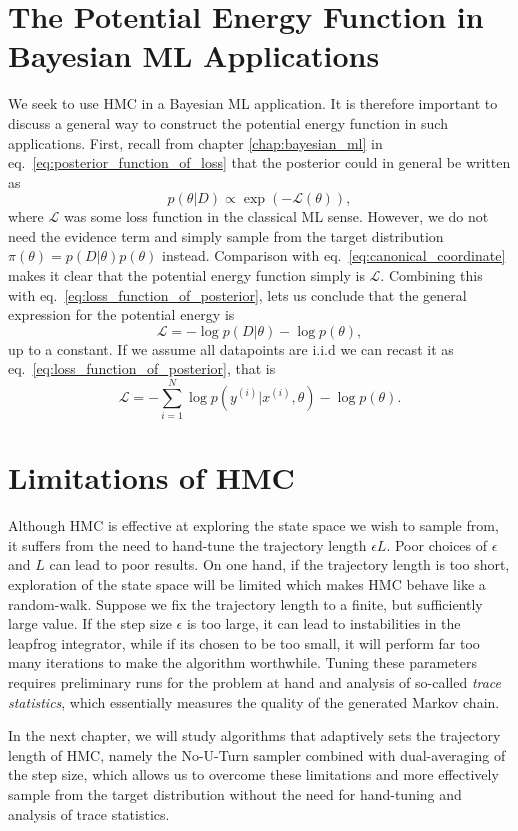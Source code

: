 \section{The Potential Energy Function in Bayesian ML Applications}
We seek to use HMC in a Bayesian ML application. It is therefore important to
discuss a general way to construct the potential energy function in such applications.
First, recall from chapter \ref{chap:bayesian_ml} in eq.~\eqref{eq:posterior_function_of_loss} that the posterior could in general be written as
\begin{equation}
  p(\theta|D) \propto \exp\left(-\mathcal{L}(\theta)\right),
\end{equation}
where $\mathcal{L}$ was some loss function in the classical ML sense.
However, we do not need the evidence term and simply sample from the target distribution $\pi(\theta) = p(D|\theta)p(\theta)$ instead.
Comparison with eq.~\eqref{eq:canonical_coordinate} makes it clear that the potential energy
function simply is $\mathcal{L}$. Combining this with eq.~\eqref{eq:loss_function_of_posterior}, lets us conclude that the general expression
for the potential energy is
\begin{equation}
  \mathcal{L} = - \log p(D|\theta) - \log p(\theta),
\end{equation}
up to a constant.
If we assume all datapoints are i.i.d we can recast it as eq.~\eqref{eq:loss_function_of_posterior}, that is
\begin{equation}
  \mathcal{L} = -\sum_{i=1}^N \log p(y^{(i)}|x^{(i)}, \theta) - \log p(\theta).
\end{equation}

\section{Limitations of HMC}
Although HMC is effective at exploring the state space we wish to sample from, it suffers from the need to hand-tune
the trajectory length $\epsilon L$. Poor choices of $\epsilon$ and $L$ can lead to poor results.
On one hand, if the trajectory length is too short, exploration of the state space will be limited 
which makes HMC behave like a random-walk. Suppose we fix the trajectory length to a finite,
but sufficiently large value.
If the step size $\epsilon$ is too large,
it can lead to instabilities in the leapfrog integrator, while if its chosen to be too small, it will perform far too many
iterations to make the algorithm worthwhile. 
Tuning these parameters requires preliminary runs for the problem at hand and analysis of so-called \textit{trace statistics}, 
which essentially measures the quality of the generated Markov chain. 

In the next chapter, we will study algorithms that adaptively sets the trajectory length of HMC,
namely the No-U-Turn sampler combined with dual-averaging of the step size, which allows us to overcome these
limitations and more effectively sample from the target distribution without the need for hand-tuning
and analysis of trace statistics.

